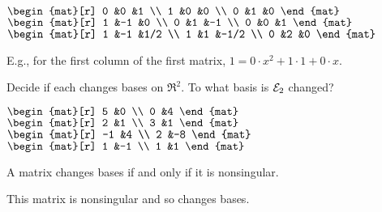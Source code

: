 \begin{exercises}
\begin{answer}
\begin{exparts*}
        \partsitem \( \begin{mat}[r]
                   0  &0  &1  \\
                   1  &0  &0  \\
                   0  &1  &0
                 \end{mat} \)
        \partsitem \( \begin{mat}[r]
                   1  &-1 &0  \\
                   0  &1  &-1 \\
                   0  &0  &1
                 \end{mat} \)
        \partsitem \( \begin{mat}[r]
                   1  &-1 &1/2  \\
                   1  &1  &-1/2 \\
                   0  &2  &0
                 \end{mat} \)
      \end{exparts*}  
      E.g., for the first column of the first matrix,
      $1=0\cdot x^2+1\cdot 1+0\cdot x$.
     \end{answer}
  \recommended \item 
    Decide if each changes bases on \( \Re^2 \).
    To what basis is \( {\cal E}_2 \) changed?
    \begin{exparts*}
      \partsitem \( \begin{mat}[r]
                 5  &0  \\
                 0  &4
               \end{mat}  \)
      \partsitem \( \begin{mat}[r]
                 2  &1  \\
                 3  &1
               \end{mat}  \)
      \partsitem \( \begin{mat}[r]
                -1  &4  \\
                 2  &-8
               \end{mat}  \)
      \partsitem \( \begin{mat}[r]
                 1  &-1 \\
                 1  &1
               \end{mat}  \)
    \end{exparts*}
    \begin{answer}
       A matrix changes bases if and only if it is nonsingular.
       \begin{exparts}
        \partsitem This matrix is nonsingular and so changes bases.

\end{exparts}
\end{answer}
\end{exercises}

